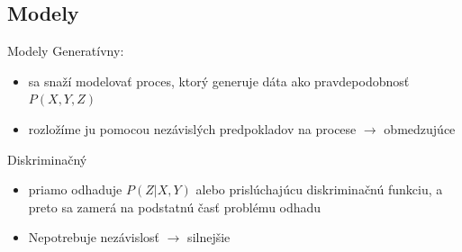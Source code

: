 \documentclass[xcolor=dvipsnames, compress, 12pt]{beamer}
\begin{document}
\subsection{Modely}
\begin{frame}{Modely}
Generatívny:
\begin{itemize}
\item sa snaží modelovať proces, ktorý generuje dáta ako pravdepodobnosť $P(X,Y,Z)$
\item rozložíme ju pomocou nezávislých predpokladov na procese $\longrightarrow$ obmedzujúce
\end{itemize} 
\pause
Diskriminačný
\begin{itemize}
\item priamo odhaduje $P(Z|X,Y)$ alebo prislúchajúcu diskriminačnú funkciu, a preto sa zamerá na podstatnú časť problému odhadu
\item Nepotrebuje nezávislosť $\longrightarrow$ silnejšie
\end{itemize}   
\end{frame}


\end{document}

